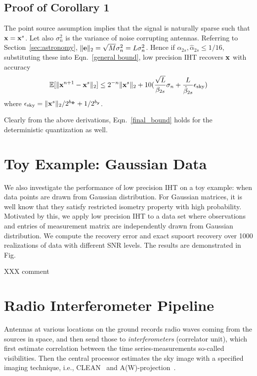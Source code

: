 \documentclass{article}
\begin{document}
\subsection{Proof of Corollary 1}
The point source assumption implies that the signal is naturally sparse such that ${\bf x} = {\bf x}^s$. Let also $\sigma_n^2$ is the variance of noise corrupting antennas. Referring to Section~\ref{sec:astronomy}, $\|{\bf e} \|_2 = \sqrt{M}\sigma_n^2 = L\sigma_n^2$. Hence if $\alpha_{2s}, \hat{\alpha}_{2s}\leq 1/16$, substituting these into Eqn.~\ref{general bound}, low precision IHT recovers ${\bf x}$ with accuracy
\begin{equation}\label{final_bound}
    \mathbb{E}[\|{\bf x}^{n+1} - {\bf x}^s \|_2] \leq 2^{-n}\| {\bf x}^s\|_2 + 10(\frac{\sqrt{L}}{\beta_{2s}}\sigma_n+\frac{L}{\hat{\beta}_{2s}}\epsilon_{\rm{sky}})
\end{equation}
where $\epsilon_{\rm{sky}} =  \|{\bf x}^s \|_2/2^{b_{\bf \Phi}} + 1/2^{b_{\bf y}}$.
\begin{remark}
Clearly from the above derivations, Eqn.~\ref{final_bound} holds for the deterministic quantization as well.
\end{remark}
\section{Toy Example: Gaussian Data}
We also investigate the performance of low precision IHT on a toy example: when data points are drawn from Gaussian distribution. For Gaussian matrices, it is well know that they satisfy restricted isometry property with high probability. Motivated by this, we apply low precision IHT to a data set where observations and entries of measurement matrix are independently drawn from Gaussian distribution. We compute the recovery error and exact supoort recovery over 1000 realizations of data with different SNR levels. The results are demonstrated in Fig.

{XXX comment}




\section{Radio Interferometer Pipeline}
Antennas at various locations on the ground records radio waves coming from the sources in space, and then send those to {\it interferometers} (correlator unit), which first estimate correlation between the time series-measurements so-called visibilities. Then the central processor estimates the sky image with a specified imaging technique, i.e., {CLEAN}~\cite{hogbom1974clean} and A(W)-projection~\cite{bhatganar2008ra}. 
\end{document}
